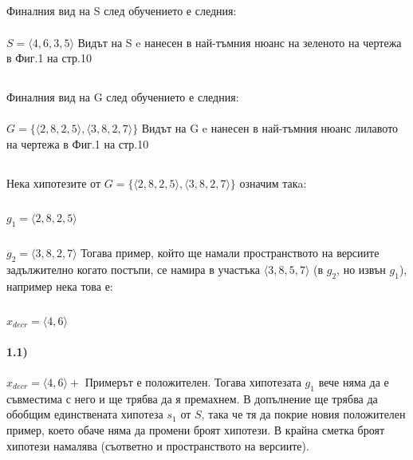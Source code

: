\documentclass[12pt]{article}
\begin{document}
	\subsection{}
	Финалния вид на S след обучението е следния:
	\paragraph{}
	$S = \langle 4, 6, 3, 5 \rangle$
	\newline\newline
	Видът на S e нанесен в най-тъмния нюанс на зеленото на чертежа в Фиг.1 на стр.10
	
	\subsection{}
		Финалния вид на G след обучението е следния:
	\paragraph{}
	$G = \{ \langle 2, 8, 2, 5 \rangle,\langle 3, 8, 2, 7 \rangle \}$
	\newline\newline
	Видът на G e нанесен в най-тъмния нюанс лилавото на чертежа в Фиг.1 на стр.10
	
	\subsection{}
	
	Нека хипотезите от $G = \{ \langle 2, 8, 2, 5 \rangle,\langle 3, 8, 2, 7 \rangle \}$ означим такa:
		\subparagraph{}
		$g_{1} = \langle 2, 8, 2, 5 \rangle$
		\subparagraph{}
		$g_{2} = \langle 3, 8, 2, 7 \rangle$
	\newline\newline
	Тогава пример, който ще намали пространството на версиите задължително когато постъпи, се намира в участъка $\langle 3, 8, 5, 7 \rangle$ (в $g_{2}$, но извън $g_{1}$), например нека това е:
		\subparagraph{}
		$x_{decr} = \langle 4,6 \rangle$
	
	\paragraph{1.1)} $x_{decr} = \langle 4,6 \rangle +$ \newline\newline
	Примерът е положителен. Тогава хипотезата $g_{1}$ вече няма да е съвместима с него и ще трябва да я премахнем. В допълнение ще трябва да обобщим единствената хипотеза $s_{1}$ от $S$, така че тя да покрие новия положителен пример, което обаче няма да промени броят хипотези. В крайна сметка броят хипотези намалява (съответно и пространството на версиите).
	
\end{document}
